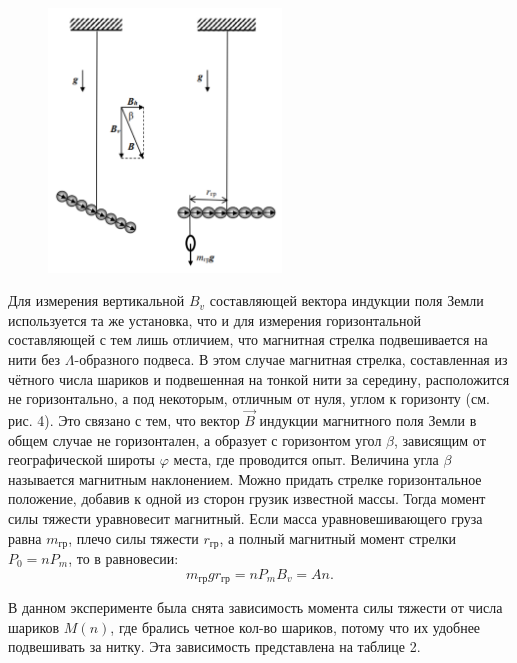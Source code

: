 \begin{figure}
\begin{center}
\includegraphics[height=7cm]{pics/vert.png}
\end{center}
\end{figure}

Для измерения вертикальной $B_v$ составляющей вектора индукции поля Земли используется
та же установка, что и для измерения горизонтальной составляющей с тем лишь отличием,
что магнитная стрелка подвешивается на нити
без $\Lambda$-образного подвеса. В этом случае магнитная стрелка, составленная из чётного числа
шариков и подвешенная на тонкой нити за середину, расположится не горизонтально, а под некоторым, отличным от нуля, углом к горизонту
(см. рис. 4). Это связано с тем, что вектор $\vec{B}$
индукции магнитного поля Земли в общем случае не горизонтален, а образует с горизонтом
угол $\beta$, зависящим от географической широты $\varphi$
места, где проводится опыт. Величина угла $\beta$
называется магнитным наклонением. Можно придать стрелке горизонтальное положение, добавив к одной из сторон грузик известной массы. Тогда момент силы тяжести уравновесит магнитный.
Если масса уравновешивающего
груза равна $m_{\text{гр}}$, плечо силы тяжести $r_{\text{гр}}$, а полный магнитный момент стрелки $P_0 = nP_m$, то
в равновесии: 
\[m_{\text{гр}}gr_{\text{гр}} = nP_mB_v = An.\]

В данном эксперименте была снята зависимость момента силы тяжести от числа шариков $M(n)$, где брались четное кол-во шариков, потому что их удобнее подвешивать за нитку. Эта зависимость представлена на таблице 
2.


